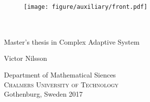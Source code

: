 
\begin{titlepage}

\addtolength{\voffset}{2cm}

\begin{figure}[H]
\centering
\vspace{1cm}	%
\texttt{[image: figure/auxiliary/front.pdf]}
\end{figure}

\mbox{}
\vfill
\renewcommand{\familydefault}{\sfdefault} \normalfont %
\textbf{{\Huge 	\titlename}} 	\\[0.5cm]
{\Large \subtitlename}\\[0.3cm]
Master's thesis in Complex Adaptive System \setlength{\parskip}{1cm}

{\Large Victor Nilsson} %

Department of Mathematical Siences \\
\textsc{Chalmers University of Technology} \\
Gothenburg, Sweden 2017

\renewcommand{\familydefault}{\rmdefault} \normalfont %
\end{titlepage}


\newpage
\restoregeometry
\thispagestyle{empty}
\mbox{}


